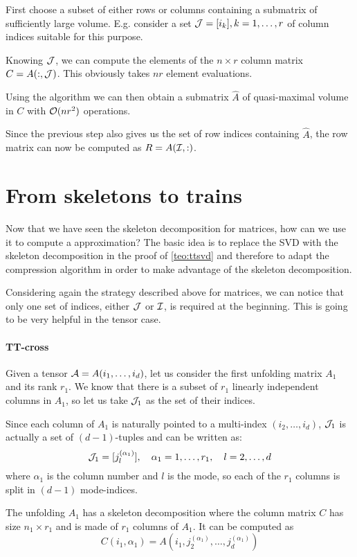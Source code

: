 First choose a subset of either rows or columns containing a submatrix of sufficiently large volume. E.g. consider a set $\mathcal{J} = [i_k], k=1,\ldots,r$ of column indices suitable for this purpose.

Knowing $\mathcal{J}$, we can compute the elements of the $n \times r$ column matrix $C = A(:,\mathcal{J})$. This obviously takes $nr$ element evaluations.

Using the  algorithm we can then obtain a submatrix $\hat{A}$ of quasi-maximal volume in $C$ with $\mathcal{O}(nr^2)$ operations.

Since the previous step also gives us the set of row indices containing $\hat{A}$, the row matrix can now be computed as $R = A(\mathcal{I},:)$.

\section{From skeletons to trains}
Now that we have seen the skeleton decomposition for matrices, how can we use it to compute a  approximation?
The basic idea is to replace the SVD with the skeleton decomposition in the proof of \ref{teo:ttsvd} and therefore to adapt the  compression algorithm in order to make advantage of the skeleton decomposition.

Considering again the strategy described above for matrices, we can notice that only one set of indices, either $\mathcal{J}$ or $\mathcal{I}$, is required at the beginning. This is going to be very helpful in the tensor case.

\paragraph{TT-cross}
Given a tensor $\mathcal{A} = A(i_1,\ldots,i_d)$, let us consider the first unfolding matrix $A_1$ and its rank $r_1$. We know that there is a subset of $r_1$ linearly independent columns in $A_1$, so let us take $\mathcal{J}_1$ as the set of their indices.

Since each column of $A_1$ is naturally pointed to a multi-index $(i_2,\ldots,i_d)$, $\mathcal{J}_1$ is actually a set of $(d-1)$-tuples and can be written as:
\begin{equation*}
  \mathcal{J}_1 = [j_l^{(\alpha_1)}], \quad \alpha_1 = 1,\ldots,r_1, \quad l = 2,\ldots,d
\end{equation*}
where $\alpha_1$ is the column number and $l$ is the mode, so each of the $r_1$ columns is split in $(d-1)$ mode-indices.

The unfolding $A_1$ has a skeleton decomposition where the column matrix $C$ has size $n_1 \times r_1$ and is made of $r_1$ columns of $A_1$.
It can be computed as
\begin{equation*}
  C(i_1,\alpha_1) = A(i_1,j_2^{(\alpha_1)},\ldots,j_d^{(\alpha_1)})
\end{equation*}

